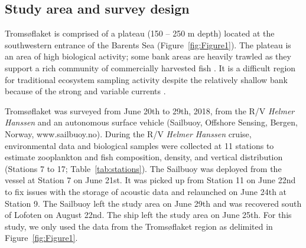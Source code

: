 \subsection{Study area and survey design}
Tromsøflaket is comprised of a plateau (150 – 250 m depth) located at the southwestern entrance of the Barents Sea (Figure~\ref{fig:Figure1}). The plateau is an area of high biological activity; some bank areas are heavily trawled as they support a rich community of commercially harvested fish \citep{Olsen2010}. It is a difficult region for traditional ecosystem sampling activity despite the relatively shallow bank because of the strong and variable currents \citep{Bellec2008, Kedra2017}.


Tromsøflaket was surveyed from June 20th to 29th, 2018, from the R/V \textit{Helmer Hanssen} and an autonomous surface vehicle (Sailbuoy, Offshore Sensing, Bergen, Norway, www.sailbuoy.no). During the R/V \textit{Helmer Hanssen} cruise, environmental data and biological samples were collected at 11 stations to estimate zooplankton and fish composition, density, and vertical distribution (Stations 7 to 17; Table~\ref{tab:stations}). The Sailbuoy was deployed from the vessel at Station 7 on June 21st. It was picked up from Station 11 on June 22nd to fix issues with the storage of acoustic data and relaunched on June 24th at Station 9. The Sailbuoy left the study area on June 29th and was recovered south of Lofoten on August 22nd. The ship left the study area on June 25th. For this study, we only used the data from the Tromsøflaket region as delimited in Figure~\ref{fig:Figure1}.

